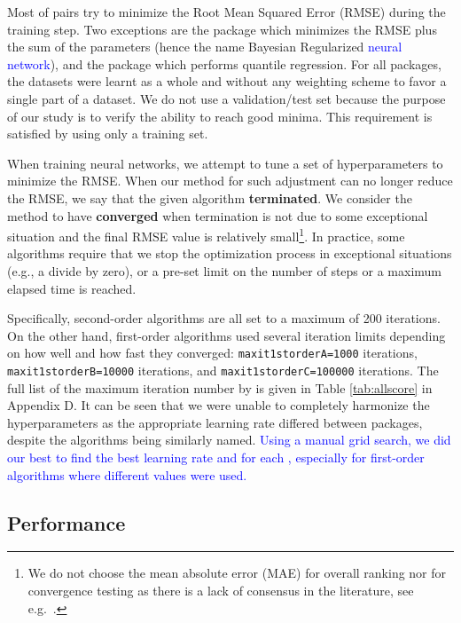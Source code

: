 Most of  pairs try to minimize the Root Mean
Squared Error (RMSE) during the training step. Two exceptions are the
 package which minimizes the RMSE plus the sum of the
parameters (hence the name Bayesian Regularized
\textcolor{blue}{neural network}), and the  package which
performs quantile regression. For all packages, the datasets were learnt
as a whole and without any weighting scheme to favor a single part of a
dataset. We do not use a validation/test set because the purpose of our
study is to verify the ability to reach good minima. This requirement is
satisfied by using only a training set.

When training neural networks, we attempt to tune a set of
hyperparameters to minimize the RMSE. When our method for such
adjustment can no longer reduce the RMSE, we say that the given
algorithm \textbf{terminated}. We consider the method to have
\textbf{converged} when termination is not due to some exceptional
situation and the final RMSE value is relatively small\footnote{We do
  not choose the mean absolute error (MAE) for overall ranking nor for
  convergence testing as there is a lack of consensus in the literature,
  see e.g.~\cite{willmott2005advantages,chai2014root}.}. In practice,
some algorithms require that we stop the optimization process in
exceptional situations (e.g., a divide by zero), or a pre-set limit on
the number of steps or a maximum elapsed time is reached.

Specifically, second-order algorithms are all set to a maximum of 200
iterations. On the other hand, first-order algorithms used several
iteration limits depending on how well and how fast they converged:
\texttt{maxit1storderA=1000} iterations, \texttt{maxit1storderB=10000}
iterations, and \texttt{maxit1storderC=100000} iterations. The full list
of the maximum iteration number by  is given in
Table \ref{tab:allscore} in Appendix D. It can be seen that we were
unable to completely harmonize the hyperparameters as the appropriate
learning rate differed between packages, despite the algorithms being
similarly named.
\textcolor{blue}{Using a manual grid search, we did our best to find the best
learning rate and  for each , especially for
first-order algorithms where different  values were used.}

\hypertarget{performance}{%
\subsection{Performance}\label{performance}}

